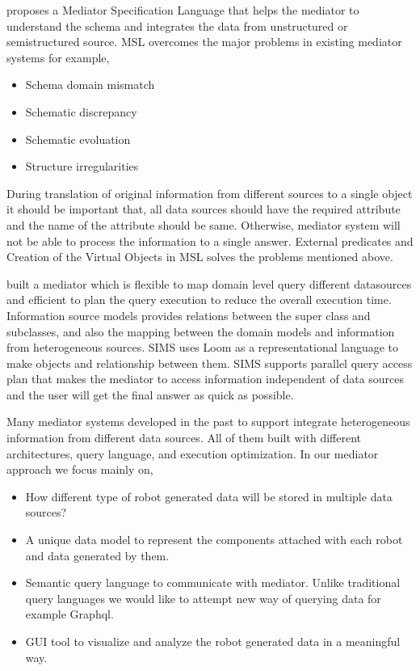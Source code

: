 \documentclass[12pt]{article}
\begin{document}
\citet{papakonstantinou1996medmaker} proposes a Mediator Specification Language that helps the mediator to understand the schema and integrates the data from unstructured or semistructured source. MSL overcomes the major problems in existing mediator systems for example,
\begin{itemize}
	\item Schema domain mismatch 
	\item Schematic discrepancy
	\item Schematic evoluation
	\item Structure irregularities
\end{itemize}

During translation of original information from different sources to a single object it should be important that, all data sources should have the required attribute and the name of the attribute should be same. Otherwise, mediator system will not be able to process the information to a single answer.  External predicates and Creation of the Virtual Objects in MSL solves the problems mentioned above.

\citet{arens1996query} built a mediator which is flexible to map domain level query different datasources and efficient to plan the query execution to reduce the overall execution time. Information source models provides relations between the super class and subclasses, and also the mapping between the domain models and information from heterogeneous sources. SIMS uses Loom as a representational language to make objects and relationship between them. SIMS supports parallel query access plan that makes the mediator to access information independent of data sources and the user will get the final answer as quick as possible.

Many mediator systems developed in the past to support integrate heterogeneous information from different data sources. All of them built with different architectures, query language, and execution optimization. In our mediator approach we focus mainly on,
\begin{itemize}
	\item How different type of robot generated data will be stored in multiple data sources?
	\item A unique data model to represent the components attached with each robot and data generated by them.
	\item Semantic query language to communicate with mediator. Unlike traditional query languages we would like to attempt new way of querying data for example Graphql.
	\item GUI tool to visualize and analyze the robot generated data in a meaningful way.
\end{itemize} 
\end{document}
